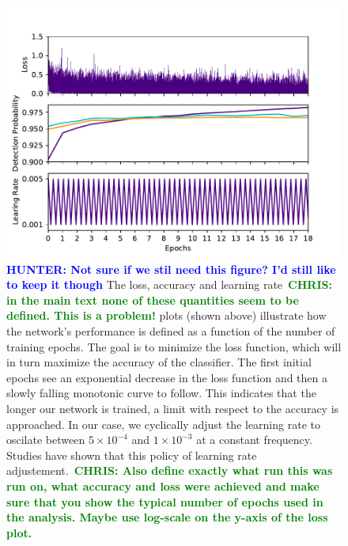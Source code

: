 \documentclass[%
 amsmath,amssymb,
 aps,
 twocolumn,
 prl,
 reprint,
floatfix,
]{revtex4-1}
\newcommand{\chris}[1]{\textbf{\textcolor{green}{CHRIS: #1}}}
\newcommand{\hunter}[1]{\textbf{\textcolor{blue}{HUNTER: #1}}}
\begin{document}
\begin{figure} 
\includegraphics[width=\columnwidth]{figures/loss.pdf}
\caption{\label{fig:loss_curve} \hunter{Not sure if we stil need this figure? I'd still like to keep it though} The
loss, accuracy and learning rate~\chris{in the main text none of these
quantities seem to be defined. This is a problem!} plots (shown above)
illustrate how the network's performance is defined as a function of the number
of training epochs. The goal is
to minimize the loss function, which will in turn maximize the accuracy of the
classifier. The first initial epochs see an exponential decrease in the loss
function and then a slowly falling monotonic curve to follow. This indicates
that the longer our network is trained, a limit with respect to the accuracy is
approached. In our case, we cyclically adjust the learning rate to oscilate
between $5 \times 10^{-4}$ and $1 \times 10^{-3}$ at a constant frequency.
Studies have shown that this policy of learning rate adjustement.~\chris{Also
define exactly what run this was run on, what accuracy and loss were achieved
and make sure that you show the typical number of epochs used in the analysis.
Maybe use log-scale on the y-axis of the loss plot.}} 
\end{figure}
\end{document}
